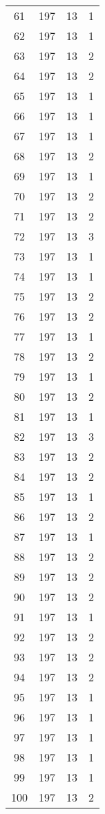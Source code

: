 \begin{longtable}[!]{c|ccc}
	61	& 197	& 13	& 1	\\
	62	& 197	& 13	& 1	\\
	63	& 197	& 13	& 2	\\
	64	& 197	& 13	& 2	\\
	65	& 197	& 13	& 1	\\
	66	& 197	& 13	& 1	\\
	67	& 197	& 13	& 1	\\
	68	& 197	& 13	& 2	\\
	69	& 197	& 13	& 1	\\
	70	& 197	& 13	& 2	\\
	71	& 197	& 13	& 2	\\
	72	& 197	& 13	& 3	\\
	73	& 197	& 13	& 1	\\
	74	& 197	& 13	& 1	\\
	75	& 197	& 13	& 2	\\
	76	& 197	& 13	& 2	\\
	77	& 197	& 13	& 1	\\
	78	& 197	& 13	& 2	\\
	79	& 197	& 13	& 1	\\
	80	& 197	& 13	& 2	\\
	81	& 197	& 13	& 1	\\
	82	& 197	& 13	& 3	\\
	83	& 197	& 13	& 2	\\
	84	& 197	& 13	& 2	\\
	85	& 197	& 13	& 1	\\
	86	& 197	& 13	& 2	\\
	87	& 197	& 13	& 1	\\
	88	& 197	& 13	& 2	\\
	89	& 197	& 13	& 2	\\
	90	& 197	& 13	& 2	\\
	91	& 197	& 13	& 1	\\
	92	& 197	& 13	& 2	\\
	93	& 197	& 13	& 2	\\
	94	& 197	& 13	& 2	\\
	95	& 197	& 13	& 1	\\
	96	& 197	& 13	& 1	\\
	97	& 197	& 13	& 1	\\
	98	& 197	& 13	& 1	\\
	99	& 197	& 13	& 1	\\
	100	& 197	& 13	& 2	\\
\end{longtable}


